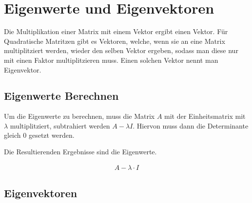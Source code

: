 \chapter{Eigenwerte und Eigenvektoren}

Die Multiplikation einer Matrix mit einem Vektor ergibt einen Vektor. Für Quadratische Matritzen gibt es Vektoren, welche, wenn sie an eine Matrix multiplitziert werden, wieder den selben Vektor ergeben, sodass man diese nur mit einen Faktor multiplitzieren muss. Einen solchen Vektor nennt man Eigenvektor.

\section{Eigenwerte Berechnen}

Um die Eigenwerte zu berechnen, muss die Matrix $A$ mit der Einheitsmatrix mit $\lambda$ multiplitziert, subtrahiert werden $A - \lambda I$. Hiervon muss dann die Determinante gleich 0 gesetzt werden.

Die Resultierenden Ergebnisse sind die Eigenwerte.

\begin{align*}
    A - \lambda \cdot I
\end{align*}

\section{Eigenvektoren}